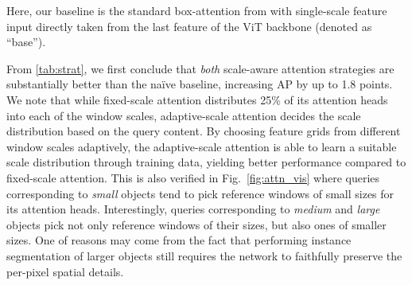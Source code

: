



 Here, our baseline is the standard box-attention from \cite{nguyen2022boxer} with single-scale feature input directly taken from the last feature of the ViT backbone (denoted as ``base''). 

From \cref{tab:strat}, we first conclude that \emph{both} scale-aware attention strategies are substantially better than the na\"ive baseline, increasing AP by up to 1.8 points. We note that while fixed-scale attention distributes 25\% of its attention heads into each of the window scales, adaptive-scale attention decides the scale distribution based on the query content. By choosing feature grids from different window scales adaptively, the adaptive-scale attention is able to learn a suitable scale distribution through training data, yielding better performance compared to fixed-scale attention. This is also verified in Fig.~\ref{fig:attn_vis} where queries corresponding to \emph{small} objects tend to pick reference windows of small sizes for its attention heads. Interestingly, queries corresponding to \emph{medium} and \emph{large} objects pick not only reference windows of their sizes, but also ones of smaller sizes. One of reasons may come from the fact that performing instance segmentation of larger objects still requires the network to faithfully preserve the per-pixel spatial details.

